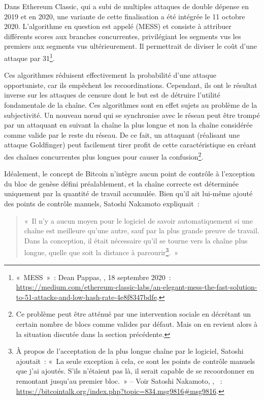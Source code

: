 Dans Ethereum Classic, qui a subi de multiples attaques de double dépense en 2019 et en 2020, une variante de cette finalisation a été intégrée le 11 octobre 2020. L'algorithme en question est appelé  (MESS) et consiste à attribuer différents scores aux branches concurrentes, privilégiant les segments vus les premiers aux segments vus ultérieurement. Il permettrait de diviser le coût d'une attaque par 31\footnote{«~MESS~»~: Dean Pappas, , 18 septembre 2020~: \url{https://medium.com/ethereum-classic-labs/an-elegant-mess-the-fast-solution-to-51-attacks-and-low-hash-rate-4e8f8347bdfe}.}.

Ces algorithmes réduisent effectivement la probabilité d'une attaque opportuniste, car ils empêchent les recoordinations. Cependant, ils ont le résultat inverse sur les attaques de censure dont le but est de détruire l'utilité fondamentale de la chaîne. Ces algorithmes sont en effet sujets au problème de la subjectivité. Un nouveau nœud qui se synchronise avec le réseau peut être trompé par un attaquant en suivant la chaîne la plus longue et non la chaîne considérée comme valide par le reste du réseau. De ce fait, un attaquant (réalisant une attaque Goldfinger) peut facilement tirer profit de cette caractéristique en créant des chaînes concurrentes plus longues pour causer la confusion\footnote{Ce problème peut être atténué par une intervention sociale en décrétant un certain nombre de blocs comme valides par défaut. Mais on en revient alors à la situation discutée dans la section précédente.}.

Idéalement, le concept de Bitcoin n'intègre aucun point de contrôle à l'exception du bloc de genèse défini préalablement, et la chaîne correcte est déterminée uniquement par la quantité de travail accumulée. Bien qu'il ait lui-même ajouté des points de contrôle manuels, Satoshi Nakamoto expliquait~:

\begin{quote}
«~Il n'y a aucun moyen pour le logiciel de savoir automatiquement si une chaîne est meilleure qu'une autre, sauf par la plus grande preuve de travail. Dans la conception, il était nécessaire qu'il se tourne vers la chaîne plus longue, quelle que soit la distance à parcourir\footnote{À propos de l'acceptation de la plus longue chaîne par le logiciel, Satoshi ajoutait~: «~La seule exception à cela, ce sont les points de contrôle manuels que j'ai ajoutés. S'ils n'étaient pas là, il serait capable de se recoordonner en remontant jusqu'au premier bloc.~» -- Voir Satoshi Nakamoto, , ~: \url{https://bitcointalk.org/index.php?topic=834.msg9816\#msg9816}.}.~»
\end{quote} %

